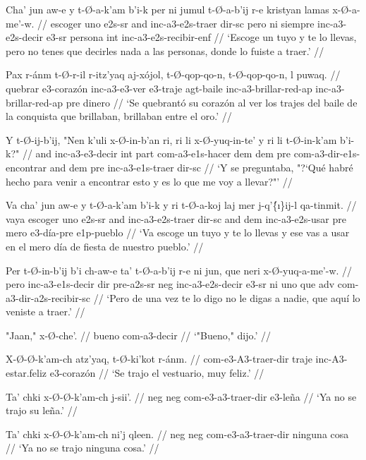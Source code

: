 \documentclass[12pt]{article}
\begin{document}
\ex
\begingl
  \gla Cha' jun aw-e y t-\O-a-k'am b'i-k per ni jumul t-\O-a-b'ij r-e kristyan lamas x-\O-a-me'-w. //
  \glb escoger uno e2s-sr and inc-a3-e2s-traer dir-sc pero ni siempre inc-a3-e2s-decir e3-sr persona int inc-a3-e2s-recibir-enf //
  \glft `Escoge un tuyo y te lo llevas, pero no tenes que decirles nada a las personas, donde lo fuiste a traer.' //
\endgl
\xe

\ex
\begingl 
  \gla Pax r-\'anm t-\O-r-il r-itz'yaq aj-x\'ojol, t-\O-qop-qo-n, t-\O-qop-qo-n, l puwaq. //
  \glb quebrar e3-coraz\'on inc-a3-e3-ver e3-traje agt-baile inc-a3-brillar-red-ap inc-a3-brillar-red-ap pre dinero //
  \glft `Se quebrant\'o su coraz\'on al ver los trajes del baile de la conquista que brillaban, brillaban entre el oro.' //
\endgl
\xe

\ex
\begingl
  \gla Y t-\O-ij-b'ij, "Nen k'uli x-\O-in-b'an ri, ri li x-\O-yuq-in-te' y ri li t-\O-in-k'am b'i-k?" //
  \glb and inc-a3-e3-decir int part com-a3-e1s-hacer dem dem pre com-a3-dir-e1s-encontrar and dem pre inc-a3-e1s-traer dir-sc //
  \glft `Y se preguntaba, "?`Qu\'e habr\'e hecho para venir a encontrar esto y es lo que me voy a llevar?"' //
\endgl
\xe

\ex
\begingl
  \gla Va cha' jun aw-e y t-\O-a-k'am b'i-k y ri t-\O-a-koj laj mer j-q'\'\{\i\}ij-l qa-tinmit. //
  \glb vaya escoger uno e2s-sr and inc-a3-e2s-traer dir-sc and dem inc-a3-e2s-usar pre mero e3-d\'ia-pre e1p-pueblo //
  \glft `Va escoge un tuyo y te lo llevas y ese vas a usar en el mero d\'ia de fiesta de nuestro pueblo.' //
\endgl
\xe

\ex
\begingl
  \gla  Per t-\O-in-b'ij b'i ch-aw-e ta' t-\O-a-b'ij r-e ni jun, que neri x-\O-yuq-a-me'-w. //
  \glb pero inc-a3-e1s-decir dir pre-a2s-sr neg inc-a3-e2s-decir e3-sr ni uno que adv com-a3-dir-a2s-recibir-sc //
  \glft `Pero de una vez te lo digo no le digas a nadie, que aqu\'i lo veniste a traer.' //
\endgl
\xe

\ex
\begingl
  \gla  "Jaan," x-\O-che'. //
  \glb  bueno com-a3-decir //
  \glft `"Bueno," dijo.' //
\endgl
\xe

\ex
\begingl
  \gla  X-\O-\O-k'am-ch atz'yaq, t-\O-ki'kot r-\'anm. //
  \glb  com-e3-A3-traer-dir traje inc-A3-estar.feliz e3-coraz\'on //
  \glft `Se trajo el vestuario, muy feliz.' //
\endgl
\xe

\ex
\begingl
  \gla  Ta' chki x-\O-\O-k'am-ch j-sii'. //
  \glb neg neg com-e3-a3-traer-dir e3-le\~na //
  \glft `Ya no se trajo su le\~na.' //
\endgl
\xe

\ex
\begingl
  \gla  Ta' chki x-\O-\O-k'am-ch ni'j qleen. //
  \glb  neg neg com-e3-a3-traer-dir ninguna cosa //
  \glft `Ya no se trajo ninguna cosa.' //
\endgl
\xe
\end{document}
